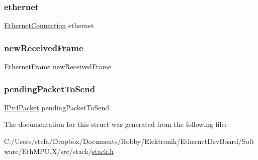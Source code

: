 \mbox{\label{structstack___ab2e5d6951e766b96b9efe5540f4bd857}} 
\subsubsection{\texorpdfstring{ethernet}{ethernet}}
{\footnotesize\ttfamily \mbox{\hyperlink{ethernet_types_8h_a2c48d64c5a0d0371a4fe5aed16f234a4}{Ethernet\+Connection}} ethernet}

\mbox{\label{structstack___acce4d7d9a581bdc9e2d7f6baafc4915f}} 
\subsubsection{\texorpdfstring{newReceivedFrame}{newReceivedFrame}}
{\footnotesize\ttfamily \mbox{\hyperlink{ethernet_types_8h_a4326bd21ae707ac8b03ec375370e3b5b}{Ethernet\+Frame}} new\+Received\+Frame}

\mbox{\label{structstack___a5b1fe5efc3ada8a585cde6c6b08dbb67}} 
\subsubsection{\texorpdfstring{pendingPacketToSend}{pendingPacketToSend}}
{\footnotesize\ttfamily \mbox{\hyperlink{group__ipv4_gae8c714b7e0ba099c47c42d77b46407f5}{I\+Pv4\+Packet}} pending\+Packet\+To\+Send}



The documentation for this struct was generated from the following file\+:\begin{DoxyCompactItemize}
\item 
C\+:/\+Users/stefa/\+Dropbox/\+Documents/\+Hobby/\+Elektronik/\+Ethernet\+Dev\+Board/\+Software/\+Eth\+M\+P\+U.\+X/src/stack/\mbox{\hyperlink{stack_8h}{stack.\+h}}\end{DoxyCompactItemize}

